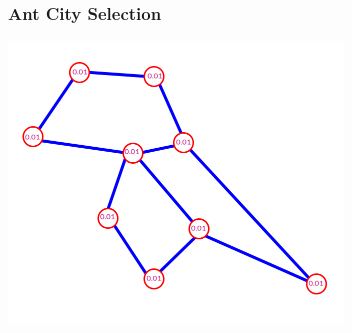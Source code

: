 \documentclass[12pt]{beamer}
\begin{document}
\begin{frame}
\frametitle{Ant City Selection}
\begin{center}
\includegraphics[height=75mm]{Images/pheromone1}\\
\end{center}
\end{frame}
\end{document}

